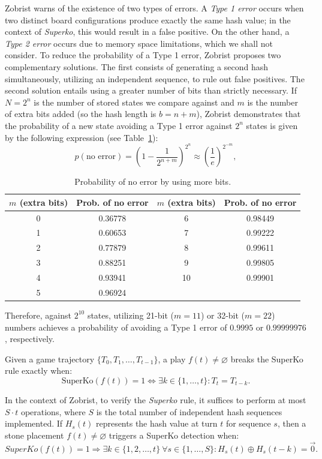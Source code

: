 Zobrist warns of the existence of two types of errors. A \textit{Type 1 error} occurs when two distinct board configurations produce exactly the same hash value; in the context of \textit{Superko}, this would result in a false positive. On the other hand, a \textit{Type 2 error} occurs due to memory space limitations, which we shall not consider.
To reduce the probability of a Type 1 error, Zobrist proposes two complementary solutions. The first consists of generating a second hash simultaneously, utilizing an independent sequence, to rule out false positives. The second solution entails using a greater number of bits than strictly necessary. If $N = 2^n$ is the number of stored states we compare against and $m$ is the number of extra bits added (so the hash length is $b = n + m$), Zobrist demonstrates that the probability of a new state avoiding a Type 1 error against $2^n$ states is given by the following expression (see Table~\ref{Tabla_prob}):
$$p(\text{no error}) = \left( 1 - \frac{1}{2^{n+m}} \right)^{2^n} \approx \left( \frac{1}{e} \right)^{2^{-m}},$$
\begin{table}[H]
	\centering
	\begin{tabular}{c|c || c|c}
		\textbf{$m$ (extra bits)} & \textbf{Prob. of no error} & \textbf{$m$ (extra bits)} & \textbf{Prob. of no error} \\ \hline
		0 & 0.36778 & 6  & 0.98449 \\
		1 & 0.60653 & 7  & 0.99222 \\
		2 & 0.77879 & 8  & 0.99611 \\
		3 & 0.88251 & 9  & 0.99805 \\
		4 & 0.93941 & 10 & 0.99901 \\
		5 & 0.96924 & \multicolumn{2}{c}{}
	\end{tabular}
	\caption{Probability of no error by using more bits.}
	\label{Tabla_prob}
\end{table}
Therefore, against $2^{10}$ states, utilizing 21-bit ($m=11$) or 32-bit ($m=22$) numbers achieves a probability of avoiding a Type 1 error of $0.9995$ or $0.99999976$, respectively.

\begin{definition}
	Given a game trajectory $\{T_0, T_1, \dots, T_{t-1}\}$, a play $f(t)\neq \varnothing$ breaks the SuperKo rule exactly when:
	$$\text{SuperKo}(f(t)) = 1 \iff \exists k \in \{1, \dots, t\} : T_t = T_{t-k}.$$
\end{definition}
In the context of Zobrist, to verify the \textit{Superko} rule, it suffices to perform at most $S \cdot t$ operations, where $S$ is the total number of independent hash sequences implemented. If $H_{s}(t)$ represents the hash value at turn $t$ for sequence $s$, then a stone placement $f(t) \neq \varnothing$ triggers a SuperKo detection when:
\[
SuperKo(f(t)) = 1 \Rightarrow \exists k \in \{1, 2, \dots, t\}\ \forall s \in \{1, \dots, S\} :
H_s(t) \oplus H_s(t-k) = \vec{0}.
\]

